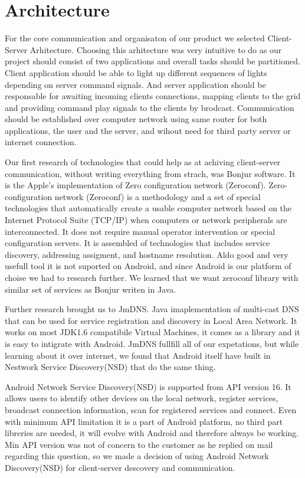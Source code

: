 \section{Architecture}

For the core communication and organisaton of our product we selected Client-Server Arhitecture.
Choosing this arhitecture was very intuitive to do as our project should consist of two applications and overall tasks should be partitioned. 
Client application should be able to light up different sequences of lights depending on server command signals.
And server application should be responsable for awaiting incoming clients connections, mapping clients to the grid and providing command play signals to the clients by brodcast.
Communication should be established over computer network using same router for both applications, the user and the server, and wihout need for third party server or internet connection. 


Our first research of technologies that could help as at achiving client-server communication, without writing everything from strach, was Bonjur software. 
It is the Apple's implementation of Zero configuration network (Zeroconf). 
Zero-configuration network (Zeroconf)  is a methodology and a set of special technologies that automatically create a usable computer network based on the Internet Protocol Suite (TCP/IP) when computers or network peripherals are interconnected. 
It does not require manual operator intervention or special configuration servers.
It is assembled of technologies that includes service discovery, addressing assigment, and hostname resolution.
Aldo good and very usefull tool it is not suported on Android, and since Android is our platform of choise we had to research further. 
We learned that we want zeroconf library with similar set of services as Bonjur writen in Java.


Further research brought us to JmDNS. Java imaplementation of multi-cast DNS that can be used for service registration and discovery in Local Area Network. 
It works on most JDK1.6 compatibile Virtual Machines, it comes as a library and it is easy to intigrate with Android. 
JmDNS fullfill all of our expetations, but while learning about it over internet, we found that Android itself have built in Nestwork Service Discovery(NSD) that do the same thing.


Android Network Service Discovery(NSD) is supported from API version 16. 
It allows users to identify other devices on the local network, register services, broadcast connection information, scan for registered services and connect.
Even with minimum API limitation it is a part of Android platform, no third part libreries are needed, it will evolve with Android and therefore always be working.
Min API version was not of concern to the customer as he replied on mail regarding this question, so we made a decision of using Android Network Discovery(NSD) for client-server descovery and communication.



